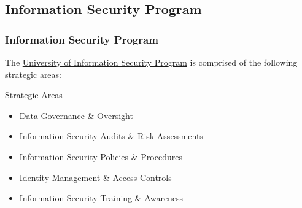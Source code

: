 \subsection{Information Security Program}
\begin{frame}
  \frametitle{Information Security Program}

  The \href{https://www.hawaii.edu/infosec/infosecprogram/}{University of {\hawaii} Information Security Program} is comprised of the following strategic areas:

  \begin{block}{Strategic Areas}
    \begin{itemize}
  \item Data Governance \& Oversight
  \item Information Security Audits \& Risk Assessments
  \item Information Security Policies \& Procedures
  \item Identity Management \& Access Controls
  \item Information Security Training \& Awareness
  \end{itemize}
  \end{block}
\end{frame}  


